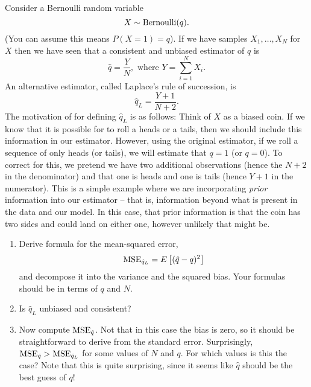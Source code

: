 \begin{exercise}
Consider a Bernoulli random variable 
\begin{equation*}
X \sim {\rm Bernoulli}(q).
\end{equation*}
(You can assume this means $P(X=1)=q$). 
If we have samples $X_1,\dots,X_N$ for $X$ then we have seen that a consistent and unbiased estimator of $q$ is 
\begin{equation*}
\hat{q} = \frac{Y}{N}, \text{ where }Y = \sum_{i=1}^NX_i.
\end{equation*}
An alternative estimator, called Laplace's rule of succession, is 
\begin{equation*}
\hat{q}_L = \frac{Y+1}{N+2}.
\end{equation*}
The motivation of for defining $\hat{q}_L$ is as follows: Think of $X$ as a biased coin. If we know that it is possible for to roll a heads or a tails, then we should include this information in our estimator. However, using the original estimator, if we roll a sequence of only heads (or tails), we will estimate that $q=1$ (or $q=0$). To correct for this, we pretend we have two additional observations (hence the $N+2$ in the denominator) and that one is heads and one is tails (hence $Y+1$ in the numerator). This is a simple example where we are incorporating \emph{prior} information  into our estimator -- that is, information beyond what is present in the data and our model. In this case, that prior information is that the coin has two sides and could land on either one, however unlikely that might be. 

\begin{enumerate}[label=(\alph*)]
\item Derive formula for the mean-squared error,
\begin{equation*}
{\rm MSE}_{\hat{q}_L} = E\left[(\hat{q}-q)^2 \right]
\end{equation*}
and decompose it into the variance and the squared bias. Your formulas should be in terms of $q$ and $N$.
\item Is $\hat{q}_L$ unbiased and consistent? 
\item Now compute ${\rm MSE}_{\hat{q}}$. Not that in this case the bias is zero, so it should be straightforward to derive from the standard error.  Surprisingly, ${\rm MSE}_{\hat{q}}>{\rm MSE}_{\hat{q}_L}$ for some values of $N$ and $q$. For which values is this the case? Note that this is quite surprising, since it seems like $\hat{q}$ should be the best guess of $q$!  \end{enumerate}


\end{exercise}


